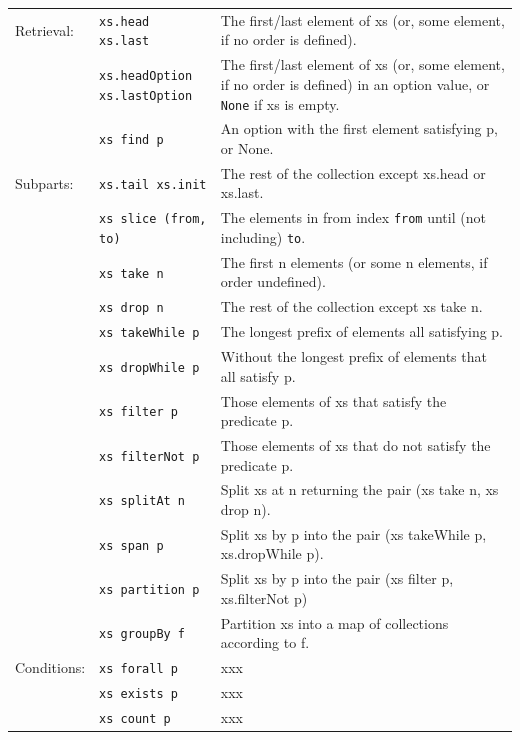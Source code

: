 \documentclass[article, a5paper]{memoir}
\begin{document}
{\begin{tabular}{l p{3.4cm} p{6.6cm}}
  Retrieval: & \texttt{xs.head \newline xs.last} &  	The first/last element of xs (or, some element, if no order is defined).\\ \cline{2-3}
      & \texttt{xs.headOption \newline xs.lastOption} & The first/last element of xs (or, some element, if no order is defined) in an option value, or \texttt{None} if xs is empty.\\ \cline{2-3}
      & \texttt{xs find p} & An option with the first element satisfying p, or None.\\ \cline{1-3}


  Subparts: & \texttt{xs.tail xs.init} & The rest of the collection except xs.head or xs.last.\\ \cline{2-3}
      & \texttt{xs slice (from, to)} & The elements in from index \texttt{from} until (not including) \texttt{to}.\\ \cline{2-3}
      & \texttt{xs take n} & The first n elements (or some n elements, if order undefined).\\ \cline{2-3}
      & \texttt{xs drop n} & The rest of the collection except xs take n.\\ \cline{2-3}
      & \texttt{xs takeWhile p} & The longest prefix of elements all satisfying p.\\ \cline{2-3}
      & \texttt{xs dropWhile p} & Without the longest prefix of elements that all satisfy p.\\ \cline{2-3}
      & \texttt{xs filter p} & Those elements of xs that satisfy the predicate p. \\ \cline{2-3}
      & \texttt{xs filterNot p} & Those elements of xs that do not satisfy the predicate p.\\ \cline{2-3}
      & \texttt{xs splitAt n} &  	Split xs at n returning the pair (xs take n, xs drop n).\\ \cline{2-3}
      & \texttt{xs span p} & Split xs by p into the pair (xs takeWhile p, xs.dropWhile p).\\ \cline{2-3}
      & \texttt{xs partition p} & Split xs by p into the pair (xs filter p, xs.filterNot p)\\ \cline{2-3}
      & \texttt{xs groupBy f} & Partition xs into a map of collections according to f.\\ \cline{1-3}


  Conditions: & \texttt{xs forall p} & xxx\\ \cline{2-3}
      & \texttt{xs exists p} & xxx\\ \cline{2-3}
      & \texttt{xs count p} & xxx\\ \cline{1-3}


\end{tabular}}
\end{document}

